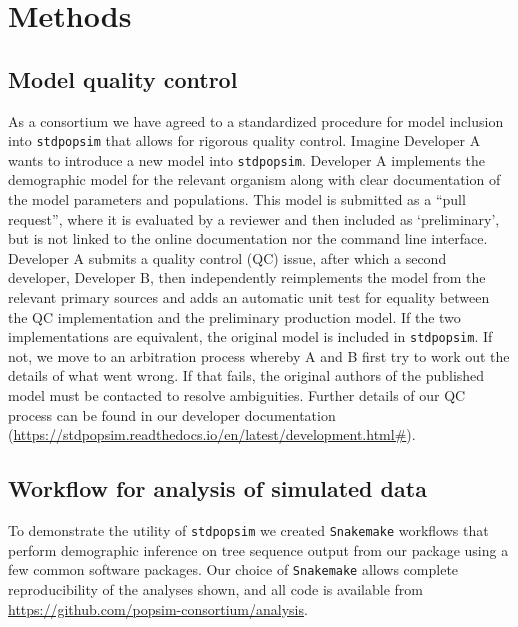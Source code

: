 \documentclass[12pt,halfline,a4paper]{ouparticle}
\newcommand{\stdpopsim}{\texttt{stdpopsim}\xspace}
\begin{document}
\section*{Methods}

\subsection*{Model quality control}
As a consortium we have agreed to a standardized procedure for model inclusion
into \stdpopsim that allows for rigorous quality control. Imagine Developer A
wants to introduce a new model into \stdpopsim. Developer A implements the
demographic model for the relevant organism along with clear documentation
of the model parameters and populations. This model is submitted as a ``pull request'',
where it is evaluated by a reviewer and then included as `preliminary',
but is not linked to the online documentation nor the command line interface.
Developer A submits a quality control (QC) issue, after which a second developer,
Developer B, then independently reimplements the model from the relevant
primary sources and adds an automatic unit test for equality between the
QC implementation and the preliminary production model. If the two
implementations are equivalent, the original model is included in \stdpopsim.
If not, we move to an arbitration process whereby A and B first try
to work out the details of what went wrong. If that fails, the original
authors of the published model must be contacted
to resolve ambiguities. 
Further details of our QC process can be found in our developer documentation 
(\url{https://stdpopsim.readthedocs.io/en/latest/development.html#}).

\subsection*{Workflow for analysis of simulated data}
To demonstrate the utility of \stdpopsim we created \texttt{Snakemake}
workflows \citep{koster2012snakemake} that perform demographic inference on
tree sequence output from our package using a few common software packages.
Our choice of \texttt{Snakemake} allows complete reproducibility of the
analyses shown, and all code is available from \url{https://github.com/popsim-consortium/analysis}.
\end{document}
